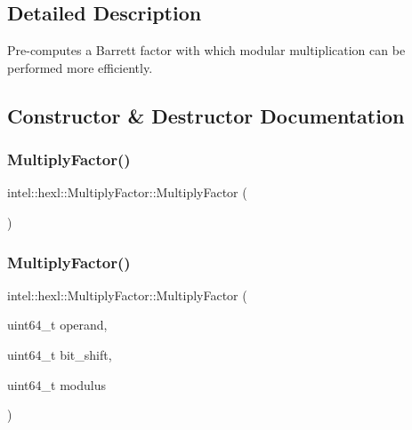 \subsection{Detailed Description}
Pre-\/computes a Barrett factor with which modular multiplication can be performed more efficiently. 

\subsection{Constructor \& Destructor Documentation}
\mbox{\label{classintel_1_1hexl_1_1MultiplyFactor_ad7b998b4a54203d6ad83237e3b3f4c51}} 
\subsubsection{\texorpdfstring{Multiply\+Factor()}{MultiplyFactor()}\hspace{0.1cm}{\footnotesize\ttfamily [1/2]}}
{\footnotesize\ttfamily intel\+::hexl\+::\+Multiply\+Factor\+::\+Multiply\+Factor (\begin{DoxyParamCaption}{ }\end{DoxyParamCaption})\hspace{0.3cm}{\ttfamily [default]}}

\mbox{\label{classintel_1_1hexl_1_1MultiplyFactor_a801de0aa37e108b21cdb6452a15f6c76}} 
\subsubsection{\texorpdfstring{Multiply\+Factor()}{MultiplyFactor()}\hspace{0.1cm}{\footnotesize\ttfamily [2/2]}}
{\footnotesize\ttfamily intel\+::hexl\+::\+Multiply\+Factor\+::\+Multiply\+Factor (\begin{DoxyParamCaption}\item[{uint64\+\_\+t}]{operand,  }\item[{uint64\+\_\+t}]{bit\+\_\+shift,  }\item[{uint64\+\_\+t}]{modulus }\end{DoxyParamCaption})\hspace{0.3cm}{\ttfamily [inline]}}



